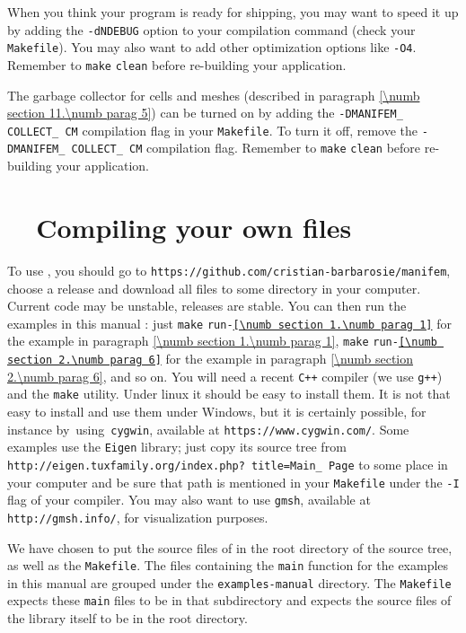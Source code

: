 When you think your program is ready for shipping, you may want to speed it up
by adding the {\small\tt -dNDEBUG} option to your compilation command
(check your {\small\tt Makefile}).
You may also want to add other optimization options like {\small\tt -O4}.
Remember to {\small\tt make} {\small\tt clean} before re-building your application.

The garbage collector for cells and meshes (described in paragraph
\ref{\numb section 11.\numb parag 5}) can be turned on by adding the
{\small\tt -DMANIFEM\_\,COLLECT\_\,CM} compilation flag in your {\small\tt Makefile}.
To turn it off, remove the {\small\tt -DMANIFEM\_\,COLLECT\_\,CM} compilation flag.
Remember to {\small\tt make} {\small\tt clean} before re-building your application.


\section{~~Compiling your own files}\label{\numb section 11.\numb parag 16}

To use \maniFEM, you should go to {\small\tt https://github.com/cristian-barbarosie/manifem},
choose a release and download all files to some directory in your computer.
Current code may be unstable, releases are stable.
You can then run the examples in this manual :
just {\small\tt make} {\small\tt run-\ref{\numb section 1.\numb parag 1}}
for the example in paragraph \ref{\numb section 1.\numb parag 1},
{\small\tt make} {\small\tt run-\ref{\numb section 2.\numb parag 6}}
for the example in paragraph \ref{\numb section 2.\numb parag 6}, and so on.
You will need a recent {\tt C++} compiler (we use {\small\tt g++}) and the {\small\tt make} utility.
Under linux it should be easy to install them.
It is not that easy to install and use them under Windows, but it is certainly possible,
for instance \hbox{by using {\small\tt cygwin}},
available at {\small\tt https://www.cygwin.com/}.
Some examples use the {\small\tt Eigen} library; just copy its source tree
from {\small\tt http://eigen.tuxfamily.org/index.php? title=Main\_\,Page}
to some place in your computer and be sure that
path is mentioned in your {\small\tt Makefile}
under the {\small\tt -I} flag of your compiler.
You may also want to use {\tt gmsh}, available at {\small\tt http://gmsh.info/},
for visualization purposes.

We have chosen to put the source files of {\maniFEM} in the root directory of the source tree,
as well as the {\small\tt Makefile}.
The files containing the {\small\tt main} function for the examples in this manual are
grouped under the {\small\tt examples-manual} directory.
The {\small\tt Makefile} expects these {\small\tt main} files to be in that subdirectory
and expects the source files of the library itself to be in the root directory.

